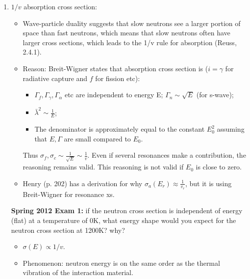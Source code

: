\documentclass{school-22.211-notes}
\begin{document}
\clearpage
{}
\begin{enumerate}
\item $1/v$ absorption cross section: 
  \begin{itemize}
  \item Wave-particle duality suggests that slow neutrons see a larger portion of space than fast neutrons, which means that slow neutrons often have larger cross sections, which leads to the 1/v rule for absorption (Reuss, 2.4.1). 
  \item Reason: Breit-Wigner states that absorption cross section is ($i = \gamma$ for radiative capture and $f$ for fission etc):
    \begin{itemize}
    \item $\Gamma_f, \Gamma_{\gamma}, \Gamma_{\alpha}$ etc are independent to energy E; $\Gamma_n \sim \sqrt{E}$ (for s-wave);
    \item $\bar{\lambda}^2 \sim \frac{1}{E}$;
    \item The denominator is approximately equal to the constant $E_0^2$ assuming that $E, \Gamma$ are small compared to $E_0$.
    \end{itemize}
    Thus $\sigma_f, \sigma_c \sim \frac{1}{\sqrt{E}} \sim \frac{1}{v}$. Even if several resonances make a contribution, the reasoning remains valid. This reasoning is not valid if $E_0$ is close to zero. 
  \item Henry (p. 202) has a derivation for why $\sigma_a(E_r) \approx \frac{1}{v_r}$, but it is using Breit-Wigner for resonance xs. 
  \end{itemize}
  \textbf{Spring 2012 Exam 1:} if the neutron cross section is independent of energy (flat) at a temperature of 0K, what energy shape would you expect for the neutron cross section at 1200K? why? 
  \begin{itemize}
    \item $\sigma(E) \propto 1/v$.
    \item Phenomenon: neutron energy is on the same order as the thermal vibration of the interaction material. 
  \end{itemize}


\end{enumerate}
\end{document}
